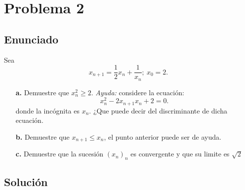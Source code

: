 \documentclass{report}
\begin{document}
\chapter{Problema 2}
\section{Enunciado}
Sea \[
x_{n+1} = \frac{1}{2}x_n + \frac{1}{x_n};\ x_0 = 2
.\] 
\begin{enumerate}
  \item[\textbf{a.}] Demuestre que $x_n^2\ge 2$. \textit{Ayuda:} considere la ecuación: \[
  x_n^2 - 2x_{n+1}x_n + 2 = 0
.\] donde la incógnita es $x_n$. ¿Que puede decir del discriminante de dicha ecuación.
  \item[\textbf{b.}] Demuestre que $x_{n+1}\le x_n$, el punto anterior puede ser de ayuda.
  \item[\textbf{c.}] Demuestre que la sucesión $\left( x_n \right)_n$ es convergente y que su limite es $\sqrt{2} $
\end{enumerate}
\section{Solución}
\end{document}
